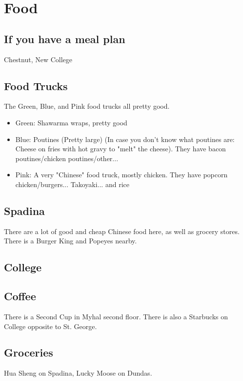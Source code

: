 \section{Food}

\subsection{If you have a meal plan}

Chestnut, New College

\subsection{Food Trucks}

The Green, Blue, and Pink food trucks all pretty good. 

\begin{itemize}
    \item Green: Shawarma wraps, pretty good
    \item Blue: Poutines (Pretty large) (In case you don't know what poutines are: Cheese on fries with hot gravy to "melt" the cheese). They have bacon poutines/chicken poutines/other...
    \item Pink: A very "Chinese" food truck, mostly chicken. They have popcorn chicken/burgers... Takoyaki... and rice
\end{itemize}

\subsection{Spadina}

There are a lot of good and cheap Chinese food here, as well as grocery stores. There is a Burger King and Popeyes nearby.

\subsection{College}


\subsection{Coffee}

There is a Second Cup in Myhal second floor. There is also a Starbucks on College opposite to St. George.

\subsection{Groceries}

Hua Sheng on Spadina, Lucky Moose on Dundas.

